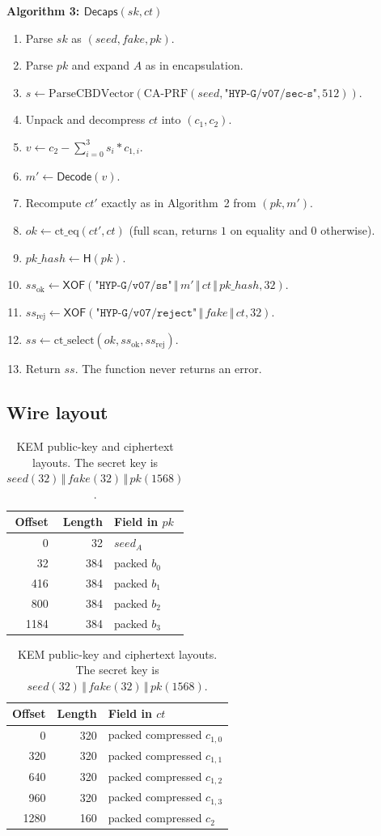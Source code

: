 \documentclass[11pt,a4paper]{article}
\theoremstyle{plain}
\theoremstyle{definition}
\theoremstyle{remark}
\newcommand{\concat}{\,\Vert\,}
\newcommand{\Hash}{\mathsf{H}}
\newcommand{\XOF}{\mathsf{XOF}}
\newcommand{\Decaps}{\mathsf{Decaps}}
\newcommand{\Decode}{\mathsf{Decode}}
\newenvironment{steps}[1]
  {\par\medskip\noindent\textbf{#1}\par\nopagebreak\small
   \begin{enumerate}[label=\arabic*:,leftmargin=*]}
  {\end{enumerate}\par\medskip}
\begin{document}
\begin{steps}{Algorithm 3: $\Decaps(sk,ct)$}
\item Parse $sk$ as $(\mathit{seed},\mathit{fake},pk)$.
\item Parse $pk$ and expand $A$ as in encapsulation.
\item $s\gets\mathrm{ParseCBDVector}(
  \mathrm{CA\text{-}PRF}(\mathit{seed},
  \texttt{"HYP-G/v07/sec-s"},512))$.
\item Unpack and decompress $ct$ into $(c_1,c_2)$.
\item $v\gets c_2-\sum_{i=0}^{3}s_i*c_{1,i}$.
\item $m'\gets\Decode(v)$.
\item Recompute $ct'$ exactly as in Algorithm~2 from $(pk,m')$.
\item $\mathit{ok}\gets\mathrm{ct\_eq}(ct',ct)$ (full scan, returns
  $1$ on equality and $0$ otherwise).
\item $\mathit{pk\_hash}\gets\Hash(pk)$.
\item $ss_{\mathrm{ok}}\gets\XOF(
  \texttt{"HYP-G/v07/ss"}\concat m'\concat ct
  \concat\mathit{pk\_hash},32)$.
\item $ss_{\mathrm{rej}}\gets\XOF(
  \texttt{"HYP-G/v07/reject"}\concat\mathit{fake}\concat ct,32)$.
\item $ss\gets\mathrm{ct\_select}(\mathit{ok},ss_{\mathrm{ok}},
  ss_{\mathrm{rej}})$.
\item Return $ss$.  The function never returns an error.
\end{steps}

\subsection{Wire layout}

\begin{table}[t]
\centering
\small
\begin{tabular}{@{}rrl@{}}
\toprule
Offset & Length & Field in $pk$ \\
\midrule
0 & 32 & $\mathit{seed}_A$ \\
32 & 384 & packed $b_0$ \\
416 & 384 & packed $b_1$ \\
800 & 384 & packed $b_2$ \\
1184 & 384 & packed $b_3$ \\
\bottomrule
\end{tabular}
\hfill
\begin{tabular}{@{}rrl@{}}
\toprule
Offset & Length & Field in $ct$ \\
\midrule
0 & 320 & packed compressed $c_{1,0}$ \\
320 & 320 & packed compressed $c_{1,1}$ \\
640 & 320 & packed compressed $c_{1,2}$ \\
960 & 320 & packed compressed $c_{1,3}$ \\
1280 & 160 & packed compressed $c_2$ \\
\bottomrule
\end{tabular}
\caption{KEM public-key and ciphertext layouts.  The secret key is
$\mathit{seed}(32)\concat\mathit{fake}(32)\concat pk(1568)$.}
\label{tab:kemwire}
\end{table}
\end{document}
